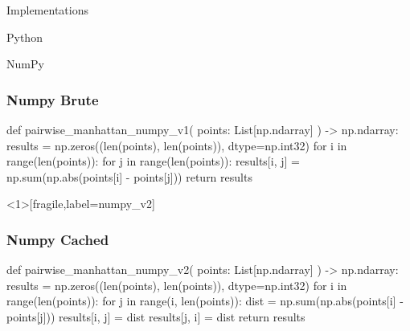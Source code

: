 \documentclass{beamer}
\theoremstyle{case}
\begin{document}
\begin{section}{Implementations}
\begin{subsection}{Python}

\end{subsection} %

\begin{subsection}{NumPy}

\begin{frame}[fragile]
    \frametitle{Numpy Brute}

    \begin{pythoncode}
def pairwise_manhattan_numpy_v1(
    points: List[np.ndarray]
) -> np.ndarray:
    results = np.zeros((len(points), len(points)), dtype=np.int32)
    for i in range(len(points)):
        for j in range(len(points)):
            results[i, j] = np.sum(np.abs(points[i] - points[j]))
    return results
    \end{pythoncode}
\end{frame}

\begin{frame}<1>[fragile,label=numpy_v2]
    \frametitle{Numpy Cached}

    \begin{pythoncode}
def pairwise_manhattan_numpy_v2(
    points: List[np.ndarray]
) -> np.ndarray:
    results = np.zeros((len(points), len(points)), dtype=np.int32)
    for i in range(len(points)):
        for j in range(i, len(points)):
            dist = np.sum(np.abs(points[i] - points[j]))
            results[i, j] = dist
            results[j, i] = dist
    return results
    \end{pythoncode}
\end{frame}


\end{subsection}
\end{section}
\end{document}
